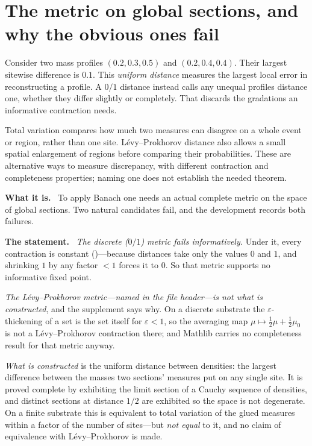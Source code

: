 \documentclass[11pt]{article}
\newcommand{\what}{\par\smallskip\noindent\textbf{What it is.}\ }
\newcommand{\statement}{\par\smallskip\noindent\textbf{The statement.}\ }
\newcommand{\id}[1]{{\small\ttfamily\seqsplit{#1}}}
\begin{document}
\section{The metric on global sections, and why the obvious ones fail}

Consider two mass profiles $(0.2,0.3,0.5)$ and $(0.2,0.4,0.4)$. Their largest
sitewise difference is $0.1$. This \emph{uniform distance} measures the
largest local error in reconstructing a profile. A $0/1$ distance instead calls
any unequal profiles distance one, whether they differ slightly or completely.
That discards the gradations an informative contraction needs.

Total variation compares how much two measures can disagree on a whole event
or region, rather than one site. L\'evy--Prokhorov distance also allows a small
spatial enlargement of regions before comparing their probabilities. These
are alternative ways to measure discrepancy, with different contraction and
completeness properties; naming one does not establish the needed theorem.

\what
To apply Banach one needs an actual complete metric on the space of global
sections. Two natural candidates fail, and the development records both
failures.

\statement
\emph{The discrete ($0/1$) metric fails informatively.} Under it, every
contraction is constant (\id{contracting\_implies\_const})---because distances
take only the values $0$ and $1$, and shrinking $1$ by any factor $<1$ forces
it to $0$. So that metric supports no informative fixed point.

\emph{The L\'evy--Prokhorov metric---named in the file header---is
\emph{not} what is constructed}, and the supplement says why. On a discrete
substrate the $\varepsilon$-thickening of a set is the set itself for
$\varepsilon<1$, so the averaging map
$\mu\mapsto\tfrac12\mu+\tfrac12\mu_0$ is not a L\'evy--Prokhorov contraction
there; and Mathlib carries no completeness result for that metric anyway.

\emph{What is constructed} is the uniform distance between densities: the
largest difference between the masses two sections' measures put on any single
site. It is proved complete by exhibiting the limit section of a Cauchy
sequence of densities, and distinct sections at distance $1/2$ are exhibited so
the space is not degenerate. On a finite substrate this is equivalent to total
variation of the glued measures within a factor of the number of sites---but
\emph{not equal} to it, and no claim of equivalence with L\'evy--Prokhorov is
made.
\end{document}
